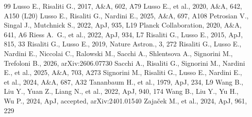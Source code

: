 \documentclass[twocolumn,10pt]{article}
\begin{document}
\begin{thebibliography}{99}
 Lusso E., Risaliti G., 2017, A\&A, 602, A79
 Lusso E., et al., 2020, A\&A, 642, A150 (L20)
 Lusso E., Risaliti G., Nardini E., 2025, A\&A, 697, A108
 Petrosian V., Singal J., Mutchnick S., 2022, ApJ, 935, L19
 Planck Collaboration, 2020, A\&A, 641, A6
 Riess A.~G., et al., 2022, ApJ, 934, L7
 Risaliti G., Lusso E., 2015, ApJ, 815, 33
 Risaliti G., Lusso E., 2019, Nature Astron., 3, 272
 Risaliti G., Lusso E., Nardini E., Niccolai C., Ralowski M., Sacchi A., Shlentsova A., Signorini M., Trefoloni B., 2026, arXiv:2606.07730
 Sacchi A., Risaliti G., Signorini M., Nardini E., et al., 2025, A\&A, 703, A273
 Signorini M., Risaliti G., Lusso E., Nardini E., et al., 2024, A\&A, 687, A32
 Tananbaum H., et al., 1979, ApJ, 234, L9
 Wang B., Liu Y., Yuan Z., Liang N., et al., 2022, ApJ, 940, 174
 Wang B., Liu Y., Yu H., Wu P., 2024, ApJ, accepted, arXiv:2401.01540
 Zaja\v{c}ek M., et al., 2024, ApJ, 961, 229
\end{thebibliography}
\end{document}
